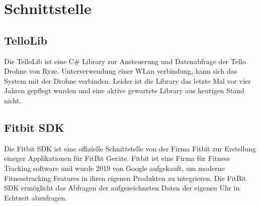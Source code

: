 \section{Schnittstelle}

\subsection{TelloLib}
Die TelloLib ist eine C# Library zur Ansteuerung und Datenabfrage der Tello Drohne von Ryze. Unterverwendung einer WLan verbindung, kann sich das System mit der Drohne verbinden. Leider ist die Library das letzte Mal vor vier Jahren gepflegt wurden und eine aktive gewartete Library aus heutigen Stand nicht. 

\subsection{Fitbit SDK}
Die Fitbit SDK ist eine offizielle Schnittstelle von der Firma Fitbit zur Erstellung eineger Applikationen für FitBit Geräte. Fitbit ist eine Firma für Fitness Tracking software und wurde 2019 von Google aufgekauft, um moderne Fitnesstracking Features in ihren eigenen Produkten zu integrieren. 
Die FitBit SDK ermöglicht das Abfragen der aufgezeichneten Daten der eigenen Uhr in Echtzeit abzufragen.